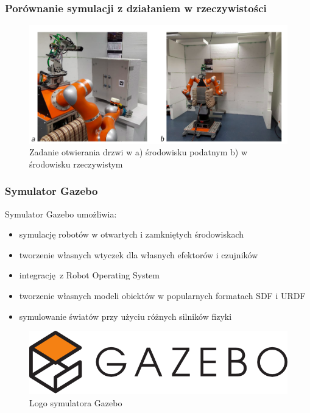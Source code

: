 
\begin{frame}
\frametitle{Porównanie symulacji z działaniem w rzeczywistości}
\begin{figure}
	\includegraphics[scale=0.35]{./images/otwieranie_real.png}
	\caption{Zadanie otwierania drzwi w a) środowisku podatnym b) w środowisku rzeczywistym}
	\end{figure}
\end{frame}


\begin{frame}
	\frametitle{Symulator Gazebo}
	Symulator Gazebo umożliwia:
	\begin{itemize}
		\item symulację robotów w otwartych i zamkniętych środowiskach
		\item tworzenie własnych wtyczek dla własnych efektorów i czujników 
		\item integrację z Robot Operating System
		\item tworzenie własnych modeli obiektów w popularnych formatach SDF i URDF
		\item symulowanie światów przy użyciu różnych silników fizyki 
	\end{itemize}
	\bigskip \medskip
	\begin{figure}
		\includegraphics[scale=0.3]{./images/gazebo.png}
		\caption{Logo symulatora Gazebo}
	\end{figure}
\end{frame}

